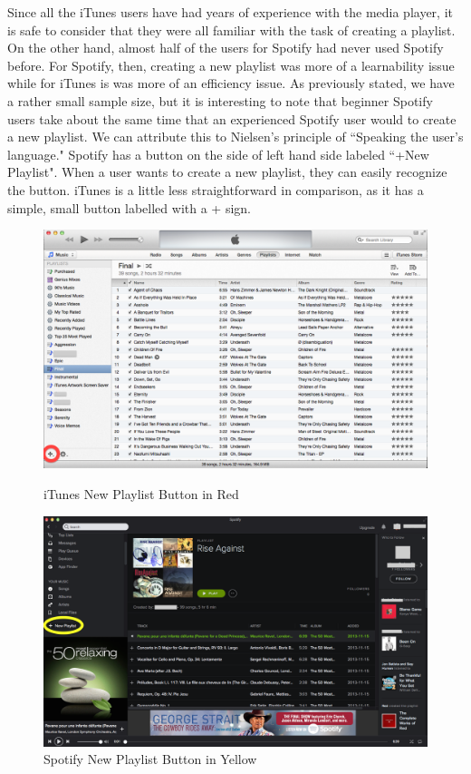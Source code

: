 \documentclass[11pt]{article}
\begin{document}
Since all the iTunes users have had years of experience with the media player, it is safe to consider that they were all familiar with the task of creating a playlist. On the other hand, almost half of the users for Spotify had never used Spotify before. For Spotify, then, creating a new playlist was more of a learnability issue while for iTunes is was more of an efficiency issue. As previously stated, we have a rather small sample size, but it is interesting to note that beginner Spotify users take about the same time that an experienced Spotify user would to create a new playlist. We can attribute this to Nielsen's principle of ``Speaking the user's language." Spotify has a button on the side of left hand side labeled ``+New Playlist". When a user wants to create a new playlist, they can easily recognize the button. iTunes is a little less straightforward in comparison, as it has a simple, small button labelled with a + sign.


\begin{figure}[H] %
   \centering
   \includegraphics[width=5.5in]{iTunes_new_playlist.png}
   \caption{iTunes New Playlist Button in Red}   
   \includegraphics[width=5.5in]{spotify_new_playlist.png}
   \caption{Spotify New Playlist Button in Yellow}                                    
   \label{fig:iTunes_new_playlist}
\end{figure}
\end{document}
